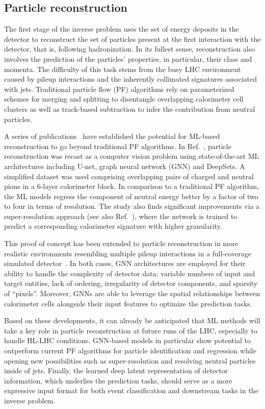 \documentclass[submission,Phys]{SciPost}
\begin{document}
\subsection{Particle reconstruction}
\label{sec:inverse_pflow}

The first stage of the inverse problem uses the set of energy deposits in the detector to reconstruct the set of particles present at the first interaction with the detector, that is, following hadronization. In its fullest sense, reconstruction also involves the prediction of the particles' properties, in particular, their class and momenta. The difficulty of this task stems from the busy LHC environment caused by pileup interactions and the inherently collimated signatures associated with jets. Traditional particle flow (PF) algorithms rely on parameterized schemes for merging and splitting to disentangle overlapping calorimeter cell clusters as well as track-based subtraction to infer the contribution from neutral particles.

A series of publications~\cite{DiBello:2020bas,Pata:2021oez,Qasim:2021hex} have established the potential for ML-based reconstruction to go beyond traditional PF algorithms. In Ref.~\cite{DiBello:2020bas}, particle reconstruction was recast as a computer vision problem using state-of-the-art ML architectures including U-net, graph neural network (GNN) and DeepSets. A simplified dataset was used comprising overlapping pairs of charged and neutral pions in a 6-layer calorimeter block. In comparison to a traditional PF algorithm, the ML models regress the component of neutral energy better by a factor of two to four in terms of resolution. The study also finds significant improvements via a super-resolution approach (see also Ref.~\cite{Baldi:2020hjm}), where the network is trained to predict a corresponding calorimeter signature with higher granularity.

This proof of concept has been extended to particle reconstruction in more realistic environments resembling multiple pileup interactions in a full-coverage simulated detector~\cite{Pata:2021oez,Qasim:2021hex}. In both cases, GNN architectures are employed for their ability to handle the complexity of detector data: variable numbers of input and target entities, lack of ordering, irregularity of detector components, and sparsity of ``pixels''. Moreover, GNNs are able to leverage the spatial relationships between calorimeter cells alongside their input features to optimize the prediction tasks.

Based on these developments, it can already be anticipated that ML methods will take a key role in particle reconstruction at future runs of the LHC, especially to handle HL-LHC conditions. GNN-based models in particular show potential to outperform current PF algorithms for particle identification and regression while opening new possibilities such as super-resolution and resolving neutral particles inside of jets. Finally, the learned deep latent representation of detector information, which underlies the prediction tasks, should serve as a more expressive input format for both event classification and downstream tasks in the inverse problem.
\end{document}
